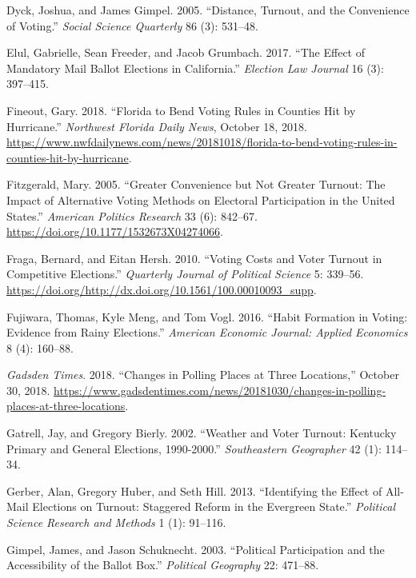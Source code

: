 \documentclass[
  12pt,
]{article}
\newlength{\cslhangindent}
\newenvironment{cslreferences}%
  {\setlength{\parindent}{0pt}%
  \everypar{\setlength{\hangindent}{\cslhangindent}}\ignorespaces}%
  {\par}
\begin{document}
\begin{cslreferences}
\leavevmode\hypertarget{ref-Dyck2005}{}%
Dyck, Joshua, and James Gimpel. 2005. ``Distance, Turnout, and the Convenience of Voting.'' \emph{Social Science Quarterly} 86 (3): 531--48.

\leavevmode\hypertarget{ref-Elul2017}{}%
Elul, Gabrielle, Sean Freeder, and Jacob Grumbach. 2017. ``The Effect of Mandatory Mail Ballot Elections in California.'' \emph{Election Law Journal} 16 (3): 397--415.

\leavevmode\hypertarget{ref-Fineout2018}{}%
Fineout, Gary. 2018. ``Florida to Bend Voting Rules in Counties Hit by Hurricane.'' \emph{Northwest Florida Daily News}, October 18, 2018. \url{https://www.nwfdailynews.com/news/20181018/florida-to-bend-voting-rules-in-counties-hit-by-hurricane}.

\leavevmode\hypertarget{ref-Fitzgerald2005}{}%
Fitzgerald, Mary. 2005. ``Greater Convenience but Not Greater Turnout: The Impact of Alternative Voting Methods on Electoral Participation in the United States.'' \emph{American Politics Research} 33 (6): 842--67. \url{https://doi.org/10.1177/1532673X04274066}.

\leavevmode\hypertarget{ref-Fraga2010}{}%
Fraga, Bernard, and Eitan Hersh. 2010. ``Voting Costs and Voter Turnout in Competitive Elections.'' \emph{Quarterly Journal of Political Science} 5: 339--56. \url{https://doi.org/http://dx.doi.org/10.1561/100.00010093_supp}.

\leavevmode\hypertarget{ref-Fujiwara2016}{}%
Fujiwara, Thomas, Kyle Meng, and Tom Vogl. 2016. ``Habit Formation in Voting: Evidence from Rainy Elections.'' \emph{American Economic Journal: Applied Economics} 8 (4): 160--88.

\leavevmode\hypertarget{ref-gadsdentimes2018}{}%
\emph{Gadsden Times}. 2018. ``Changes in Polling Places at Three Locations,'' October 30, 2018. \url{https://www.gadsdentimes.com/news/20181030/changes-in-polling-places-at-three-locations}.

\leavevmode\hypertarget{ref-Gatrell2002}{}%
Gatrell, Jay, and Gregory Bierly. 2002. ``Weather and Voter Turnout: Kentucky Primary and General Elections, 1990-2000.'' \emph{Southeastern Geographer} 42 (1): 114--34.

\leavevmode\hypertarget{ref-Gerber2013}{}%
Gerber, Alan, Gregory Huber, and Seth Hill. 2013. ``Identifying the Effect of All-Mail Elections on Turnout: Staggered Reform in the Evergreen State.'' \emph{Political Science Research and Methods} 1 (1): 91--116.

\leavevmode\hypertarget{ref-Gimpel2003}{}%
Gimpel, James, and Jason Schuknecht. 2003. ``Political Participation and the Accessibility of the Ballot Box.'' \emph{Political Geography} 22: 471--88.


\end{cslreferences}
\end{document}
